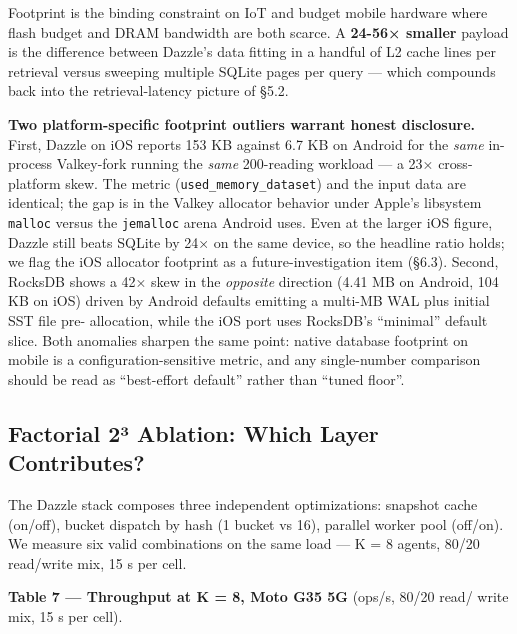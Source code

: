 Footprint is the binding constraint on IoT and budget mobile hardware where
flash budget and DRAM bandwidth are both scarce. A \textbf{24-56× smaller}
payload is the difference between Dazzle's data fitting in a handful of L2 cache
lines per retrieval versus sweeping multiple SQLite pages per query --- which
compounds back into the retrieval-latency picture of §5.2.

\textbf{Two platform-specific footprint outliers warrant honest disclosure.}
First, Dazzle on iOS reports 153 KB against 6.7 KB on Android for the
\emph{same} in-process Valkey-fork running the \emph{same} 200-reading workload
--- a 23× cross-platform skew. The metric (\texttt{used\_memory\_dataset}) and
the input data are identical; the gap is in the Valkey allocator behavior under
Apple's libsystem \texttt{malloc} versus the \texttt{jemalloc} arena Android
uses. Even at the larger iOS figure, Dazzle still beats SQLite by 24× on the
same device, so the headline ratio holds; we flag the iOS allocator footprint as
a future-investigation item (§6.3). Second, RocksDB shows a 42× skew in the
\emph{opposite} direction (4.41 MB on Android, 104 KB on iOS) driven by Android
defaults emitting a multi-MB WAL plus initial SST file pre- allocation, while
the iOS port uses RocksDB's ``minimal'' default slice. Both anomalies sharpen
the same point: native database footprint on mobile is a configuration-sensitive
metric, and any single-number comparison should be read as ``best-effort
default'' rather than ``tuned floor''.

\subsection{Factorial 2³ Ablation: Which Layer
Contributes?}\label{factorial-2uxb3-ablation-which-layer-contributes}

The Dazzle stack composes three independent optimizations: snapshot cache
(on/off), bucket dispatch by hash (1 bucket vs 16), parallel worker pool
(off/on). We measure six valid combinations on the same load --- K = 8 agents,
80/20 read/write mix, 15 s per cell.

\textbf{Table 7 --- Throughput at K = 8, Moto G35 5G} (ops/s, 80/20 read/ write
mix, 15 s per cell).

